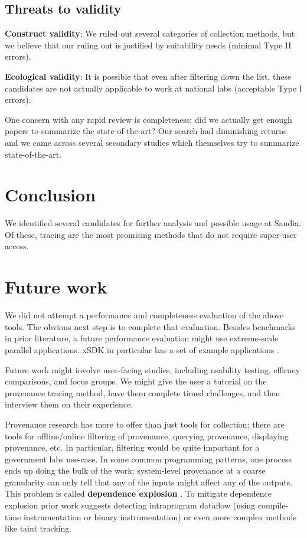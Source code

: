 
\subsection{Threats to validity}

\textbf{Construct validity}:
We ruled out several categories of collection methods, but we believe that our ruling out is justified by suitability needs (minimal Type II errors).

\textbf{Ecological validity}:
It is possible that even after filtering down the list, these candidates are not actually applicable to work at national labs (acceptable Type I errors).

One concern with any rapid review is completeness; did we actually get enough papers to summarize the state-of-the-art?
Our search had diminishing returns and we came across several secondary studies which themselves try to summarize state-of-the-art.

\section{Conclusion}

We identified several candidates for further analysis and possible usage at Sandia.
Of these, tracing are the most promising methods that do not require super-user access.

\section{Future work}

We did not attempt a performance and completeness evaluation of the above tools.
The obvious next step is to complete that evaluation.
Besides benchmarks in prior literature, a future performance evaluation might use extreme-scale parallel applications.
xSDK in particular has a set of example applications \cite{bartlett_xsdk_2017}.

Future work might involve user-facing studies, including usability testing, efficacy comparisons, and focus groups.
We might give the user a tutorial on the provenance tracing method, have them complete timed challenges, and then interview them on their experience.

Provenance research has more to offer than just tools for collection; there are tools for offline/online filtering of provenance, querying provenance, displaying  provenance, etc.
In particular, filtering would be quite important for a government labs use-case.
In some common programming patterns, one process ends up doing the bulk of the work; system-level provenance at a coarse granularity can only tell that any of the inputs might affect any of the outputs.
This problem is called \textbf{dependence explosion} \cite{lee_high_2017}.
To mitigate dependence explosion prior work suggests detecting intraprogram dataflow (using compile-time instrumentation or binary instrumentation) or even more complex methods like taint tracking.
